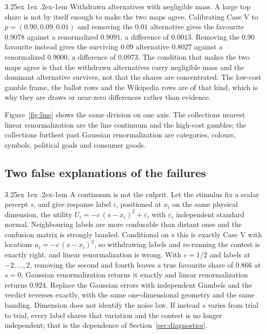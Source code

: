 \documentclass[11pt]{article}
\makeatletter
\theoremstyle{italichead}
\renewcommand\paragraph{\@startsection{paragraph}{4}{\z@}%
  {3.25ex \@plus1ex \@minus.2ex}{-1em}%
  {\normalfont\normalsize\itshape}}
\makeatother
\begin{document}
\paragraph{Withdrawn alternatives with negligible mass.} A large top share is not by itself
enough to make the two maps agree. Calibrating Case V to $p = (0.90, 0.09, 0.01)$ and removing
the $0.01$ alternative gives the favourite $0.9078$ against a renormalized $0.9091$, a
difference of $0.0013$. Removing the $0.90$ favourite instead gives the surviving $0.09$
alternative $0.8027$ against a renormalized $0.9000$, a difference of $0.0973$. The condition
that makes the two maps agree is that the withdrawn alternatives carry negligible mass and the
dominant alternative survives, not that the shares are concentrated. The low-cost gamble frame,
the ballot rows and the Wikipedia rows are of that kind, which is why they are draws or
near-zero differences rather than evidence.

Figure~\ref{fig:line} shows the same division on one axis. The collections nearest linear
renormalization are the line continuum and the high-cost gambles; the collections furthest past
Gaussian renormalization are categories, colours, symbols, political goals and consumer goods.

\subsection{Two false explanations of the failures}
\label{sec:notculprit}

\paragraph{A continuum is not the culprit.} Let the stimulus fix a scalar percept $s$, and give
response label $i$, positioned at $x_i$ on the same physical dimension, the utility
$U_i = -c\,(s - x_i)^2 + \varepsilon_i$ with $\varepsilon_i$ independent standard normal.
Neighbouring labels are more confusable than distant ones and the confusion matrix is strongly
banded. Conditional on $s$ this is exactly Case V with locations $a_i = -c\,(s-x_i)^2$, so
withdrawing labels and re-running the contest is exactly right, and linear renormalization is
wrong. With $c = 1/2$ and labels at $-2,\dots,2$, removing the second and fourth leaves a true
favourite share of $0.866$ at $s=0$; Gaussian renormalization returns it exactly and linear
renormalization returns $0.924$. Replace the Gaussian errors with independent Gumbels and the
verdict reverses exactly, with the same one-dimensional geometry and the same banding. Dimension
does not identify the noise law. If instead $s$ varies from trial to trial, every label shares
that variation and the contest is no longer independent; that is the dependence of
Section~\ref{sec:diagnostics}.
\end{document}
